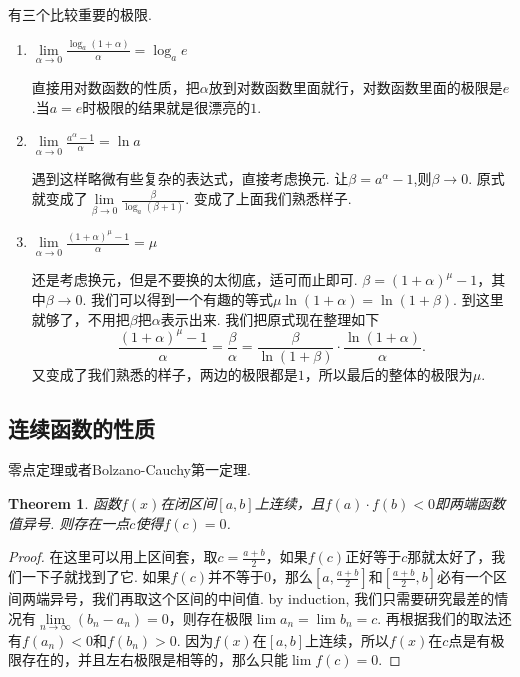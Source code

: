 \documentclass{article}
\newtheorem{theorem}{Theorem}[section]
\begin{document}
有三个比较重要的极限.

\begin{enumerate}
	\item $\lim\limits_{\alpha \rightarrow 0} \frac{\log_a(1+\alpha)}{\alpha} = \log_a e$

直接用对数函数的性质，把$\alpha$放到对数函数里面就行，对数函数里面的极限是$e$.当$a=e$时极限的结果就是很漂亮的$1$.			
	
	\item $\lim\limits_{\alpha \rightarrow 0} \frac{a^\alpha-1}{\alpha} = \ln a$
	
遇到这样略微有些复杂的表达式，直接考虑换元. 让$\beta = a^\alpha -1$,则$\beta \rightarrow 0$. 原式就变成了$\lim\limits_{\beta \rightarrow 0} \frac{\beta}{\log_a(\beta+1)}$. 变成了上面我们熟悉样子.	
	
	\item $\lim\limits_{\alpha \rightarrow 0} \frac{(1+\alpha)^\mu-1}{\alpha} = \mu$
	
还是考虑换元，但是不要换的太彻底，适可而止即可. $\beta = (1+\alpha)^\mu - 1$，其中$\beta \rightarrow 0$. 我们可以得到一个有趣的等式$\mu \ln(1+\alpha) = \ln(1+\beta)$. 到这里就够了，不用把$\beta$把$\alpha$表示出来. 我们把原式现在整理如下\[\frac{(1+\alpha)^\mu-1}{\alpha} = \frac{\beta}{\alpha} = \frac{\beta}{\ln(1+\beta)}\cdot\frac{\ln(1+\alpha)}{\alpha}.\]又变成了我们熟悉的样子，两边的极限都是$1$，所以最后的整体的极限为$\mu$.	
\end{enumerate}

\newpage
\subsection{连续函数的性质}

零点定理或者Bolzano-Cauchy第一定理.
\begin{theorem}
函数$f(x)$在闭区间$[a,b]$上连续，且$f(a) \cdot f(b) < 0$即两端函数值异号. 则存在一点$c$使得$f(c)=0$.
\end{theorem}

\begin{proof}
在这里可以用上区间套，取$c =\frac{a+b}{2}$，如果$f(c)$正好等于$c$那就太好了，我们一下子就找到了它. 如果$f(c)$并不等于$0$，那么$[a,\frac{a+b}{2}]$和$[\frac{a+b}{2},b]$必有一个区间两端异号，我们再取这个区间的中间值. by induction, 我们只需要研究最差的情况有$\lim\limits_{n \rightarrow \infty}(b_n - a_n)=0$，则存在极限$\lim a_n = \lim b_n = c$. 再根据我们的取法还有$f(a_n) < 0$和$f(b_n) > 0$. 因为$f(x)$在$[a,b]$上连续，所以$f(x)$在$c$点是有极限存在的，并且左右极限是相等的，那么只能$\lim f(c) = 0$.
\end{proof} 
\end{document}
